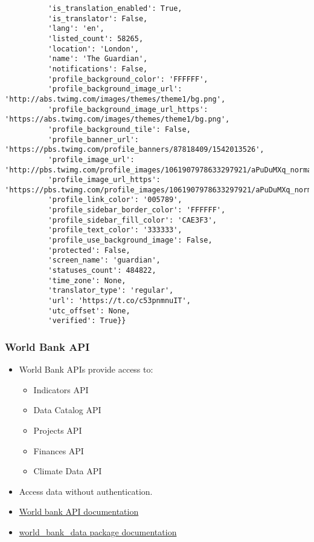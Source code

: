 \begin{frame}[fragile]
\begin{verbatim}
          'is_translation_enabled': True,
          'is_translator': False,
          'lang': 'en',
          'listed_count': 58265,
          'location': 'London',
          'name': 'The Guardian',
          'notifications': False,
          'profile_background_color': 'FFFFFF',
          'profile_background_image_url': 'http://abs.twimg.com/images/themes/theme1/bg.png',
          'profile_background_image_url_https': 'https://abs.twimg.com/images/themes/theme1/bg.png',
          'profile_background_tile': False,
          'profile_banner_url': 'https://pbs.twimg.com/profile_banners/87818409/1542013526',
          'profile_image_url': 'http://pbs.twimg.com/profile_images/1061907978633297921/aPuDuMXq_normal.jpg',
          'profile_image_url_https': 'https://pbs.twimg.com/profile_images/1061907978633297921/aPuDuMXq_normal.jpg',
          'profile_link_color': '005789',
          'profile_sidebar_border_color': 'FFFFFF',
          'profile_sidebar_fill_color': 'CAE3F3',
          'profile_text_color': '333333',
          'profile_use_background_image': False,
          'protected': False,
          'screen_name': 'guardian',
          'statuses_count': 484822,
          'time_zone': None,
          'translator_type': 'regular',
          'url': 'https://t.co/c53pnmnuIT',
          'utc_offset': None,
          'verified': True}}
\end{verbatim}

\end{frame}


\begin{frame}
    \frametitle{World Bank API}
    \begin{itemize}
        \item World Bank APIs provide access to:
        \begin{itemize}
            \item Indicators API
            \item Data Catalog API
            \item Projects API
            \item Finances API
            \item Climate Data API
        \end{itemize}
        \item Access data without authentication.
        \item \href{https://datahelpdesk.worldbank.org/knowledgebase/articles/889386-developer-information-overview}{World bank API documentation}
        \item \href{https://github.com/mwouts/world_bank_data}{world\_bank\_data package documentation}
    \end{itemize}
\end{frame}

